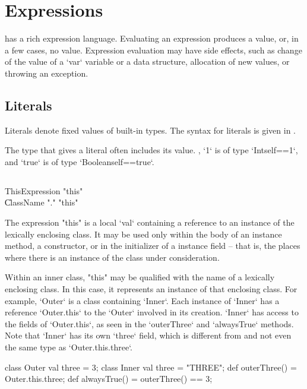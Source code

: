 \chapter{Expressions}\label{XtenExpressions}

\Xten{} has a rich expression language.
Evaluating an expression produces a value, or, in a few cases, no value. 
Expression evaluation may have side effects, such as change of the value of a 
\xcd`var` variable or a data structure, allocation of new values, or throwing
an exception. 


\section{Literals}

Literals denote fixed values of built-in types. 
The syntax for literals is given in . 

The type that \Xten{} gives a literal often includes its value. \Eg, \xcd`1`
is of type \xcd`Int{self==1}`, and \xcd`true` is of type
\xcd`Boolean{self==true}`.

\section{}

\begin{grammar}
ThisExpression \: \xcd"this" \\
\| ClassName \xcd"." \xcd"this" \\
\end{grammar}

The expression \xcd"this" is a  local \xcd`val` containing a reference
to an instance of the lexically enclosing class.
It may be used only within the body of an instance method, a
constructor, or in the initializer of a instance field -- that is, the places
where there is an instance of the class under consideration.

Within an inner class, \xcd"this" may be qualified with the
name of a lexically enclosing class.  In this case, it
represents an instance of that enclosing class.  
For example, \xcd`Outer` is a class containing \xcd`Inner`.  Each instance of
\xcd`Inner` has a reference \xcd`Outer.this` to the \xcd`Outer` involved in its
creation.  \xcd`Inner` has access to the fields of \xcd`Outer.this`, as seen
in the \xcd`outerThree` and \xcd`alwaysTrue` methods.  Note that \xcd`Inner`
has its own \xcd`three` field, which is different from and not even the same
type as \xcd`Outer.this.three`. 
\begin{xten}
class Outer {
  val three = 3;
  class Inner {
     val three = "THREE";
     def outerThree() = Outer.this.three;
     def alwaysTrue() = outerThree() == 3;
  }
}
\end{xten}
%

